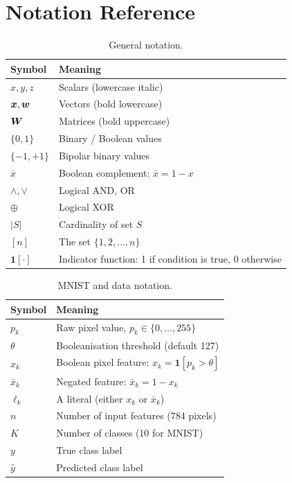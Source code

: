 \chapter{Notation Reference}
\label{app:notation}

\begin{table}[htbp]
\centering
\caption{General notation.}
\begin{tabular}{@{}ll@{}}
  \toprule
  \textbf{Symbol} & \textbf{Meaning} \\
  \midrule
  $x, y, z$ & Scalars (lowercase italic) \\
  $\bm{x}, \bm{w}$ & Vectors (bold lowercase) \\
  $\bm{W}$ & Matrices (bold uppercase) \\
  $\{0, 1\}$ & Binary / Boolean values \\
  $\{-1, +1\}$ & Bipolar binary values \\
  $\bar{x}$ & Boolean complement: $\bar{x} = 1 - x$ \\
  $\wedge, \vee$ & Logical AND, OR \\
  $\oplus$ & Logical XOR \\
  $|S|$ & Cardinality of set $S$ \\
  $[n]$ & The set $\{1, 2, \ldots, n\}$ \\
  $\mathbf{1}[\cdot]$ & Indicator function: 1 if condition is true, 0 otherwise \\
  \bottomrule
\end{tabular}
\end{table}

\begin{table}[htbp]
\centering
\caption{MNIST and data notation.}
\begin{tabular}{@{}ll@{}}
  \toprule
  \textbf{Symbol} & \textbf{Meaning} \\
  \midrule
  $p_k$ & Raw pixel value, $p_k \in \{0, \ldots, 255\}$ \\
  $\theta$ & Booleanisation threshold (default 127) \\
  $x_k$ & Boolean pixel feature: $x_k = \mathbf{1}[p_k > \theta]$ \\
  $\bar{x}_k$ & Negated feature: $\bar{x}_k = 1 - x_k$ \\
  $\ell_k$ & A literal (either $x_k$ or $\bar{x}_k$) \\
  $n$ & Number of input features (784 pixels) \\
  $K$ & Number of classes (10 for MNIST) \\
  $y$ & True class label \\
  $\hat{y}$ & Predicted class label \\
  \bottomrule
\end{tabular}
\end{table}


